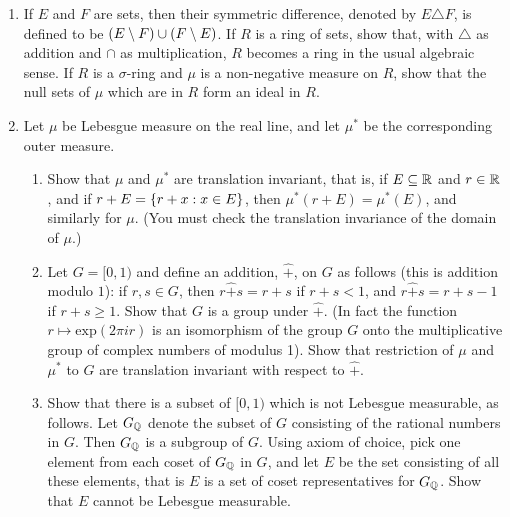 \begin{enumerate}[label=\arabic*)]
\item If $E$ and $F$ are sets, then their symmetric difference, denoted by $E\triangle F$, is defined to be $(E\setminus F)\cup(F\setminus E)$. If $R$ is a ring of sets, show that, with $\triangle$ as addition and $\cap$ as multiplication, $R$ becomes a ring in the usual algebraic sense. If $R$ is a $\sigma$-ring and $\mu$ is a non-negative measure on $R$, show that the null sets of $\mu$ which are in $R$ form an ideal in $R$.

\item Let $\mu$ be Lebesgue measure on the real line, and let $\mu^*$ be the corresponding outer measure.
\begin{enumerate}
\item Show that $\mu$ and $\mu^*$ are translation invariant, that is, if $E\subseteq\mathbb{R}$ and $r\in\mathbb{R}$, and if $r+E=\left\{r+x:x\in E\right\}$, then $\mu^*(r+E)=\mu^*(E)$, and similarly for $\mu$. (You must check the translation invariance of the domain of $\mu$.)
\item Let $G=[0,1)$ and define an addition, $\hat{+}$, on $G$ as follows (this is addition modulo $1$): if $r,s\in G$, then $r\hat{+}s=r+s$ if $r+s<1$, and $r\hat{+}s=r+s-1$ if $r+s\geq1$. Show that $G$ is a group under $\hat{+}$. (In fact the function $r\mapsto\text{exp}(2\pi ir)$ is an isomorphism of the group $G$ onto the multiplicative group of complex numbers of modulus 1). Show that restriction of $\mu$ and $\mu^*$ to $G$ are translation invariant with respect to $\hat{+}$.
\item Show that there is a subset of $[0,1)$ which is not Lebesgue measurable, as follows. Let $G_{\mathbb{Q}}$ denote the subset of $G$ consisting of the rational numbers in $G$. Then $G_{\mathbb{Q}}$ is a subgroup of $G$. Using axiom of choice, pick one element from each coset of $G_{\mathbb{Q}}$ in $G$, and let $E$ be the set consisting of all these elements, that is $E$ is a set of coset representatives for $G_{\mathbb{Q}}$. Show that $E$ cannot be Lebesgue measurable.
\end{enumerate}

\end{enumerate}